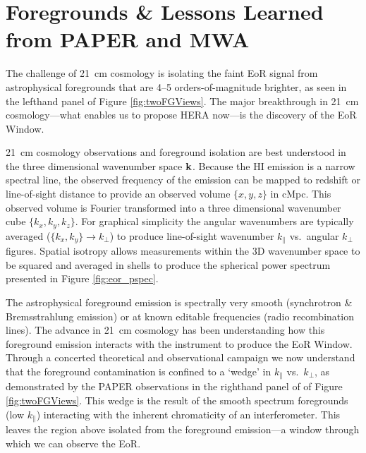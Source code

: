 \documentclass[preprint]{aastex}
\def\kperp{k_{\bot}}
\def\kpar{k_{\|}}
\def\k{{\bf k}}
\def\HI{{H{\small I }}}
\begin{document}
\vspace{-0.25in}
\section{Foregrounds \& Lessons Learned from PAPER and MWA}
\label{LessonsSec}

The challenge of 21~cm cosmology is isolating the faint EoR signal from
astrophysical foregrounds that are 4--5 orders-of-magnitude brighter, as seen
in the lefthand panel of Figure \ref{fig:twoFGViews}. The major breakthrough in
21~cm cosmology---what enables us to propose HERA now---is the discovery of the
EoR Window.

21~cm cosmology observations and foreground isolation are best understood in
the three dimensional wavenumber space $\k$.  Because the \HI emission is a
narrow spectral line, the observed frequency of the emission can be mapped to
redshift or line-of-sight distance to provide an observed volume $\{x,y,z\}$ in
cMpc. This observed volume is Fourier transformed into a three dimensional
wavenumber cube $\{k_{x}, k_{y}, k_{z}\}$. For graphical simplicity the angular
wavenumbers are typically averaged ($\{k_{x},k_{y}\}\rightarrow\kperp$) to
produce line-of-sight wavenumber $\kpar$ vs.\ angular $\kperp$ figures. 
Spatial isotropy allows measurements within the 3D wavenumber space to be
squared and averaged in shells to produce the spherical power spectrum
presented in Figure \ref{fig:eor_pspec}.

The astrophysical foreground emission is spectrally very smooth (synchrotron \&
Bremsstrahlung emission) or at known editable frequencies (radio recombination
lines). The advance in 21~cm cosmology has been understanding how this
foreground emission interacts with the instrument to produce the EoR Window.
Through a concerted theoretical and observational campaign
\citep{morales_et_al2012,parsons_et_al2012b,vedantham_2012,Datta_2010,hazelton_et_al2013,pober_et_al2013,parsons_et_al2013,dillon_et_al2013b}
we now understand that the foreground contamination is confined to a `wedge' in
$\kpar$ vs.\ $\kperp$, as demonstrated by the PAPER observations in the
righthand panel of of Figure \ref{fig:twoFGViews}. This wedge is the result of
the smooth spectrum foregrounds (low $\kpar$) interacting with the inherent
chromaticity of an interferometer. This leaves the region above isolated from
the foreground emission---a window through which we can observe the EoR.
\end{document}

